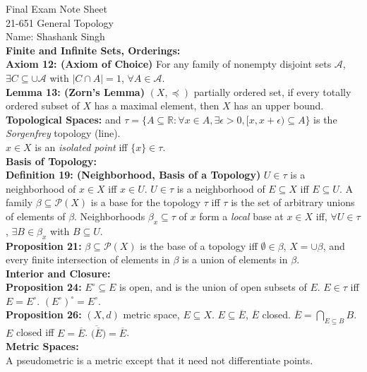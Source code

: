 \documentclass[11pt]{article}
\newcommand{\myname}{Shashank Singh}
\newcommand{\myclass}{21-651 General Topology}
\newcommand{\R}{\mathbb{R}} %
\newcommand{\pow}[1]{\mathcal{P}\left(#1\right)} %
\begin{document}
\thispagestyle{plain}

{\Large Final Exam Note Sheet} \\
\myclass \\
Name: \myname \\
{\bf Finite and Infinite Sets, Orderings:} \\
{\bf Axiom 12: (Axiom of Choice)} For any family of nonempty disjoint sets
$\mathcal{A}$, $\exists C \subseteq \cup \mathcal{A}$ with $|C \cap A| = 1$,
$\forall A \in \mathcal{A}$. \\
{\bf Lemma 13: (Zorn's Lemma)} $(X,\preceq)$ partially ordered set, if every
totally ordered subset of $X$ has a maximal element, then $X$ has an upper
bound. \\
{\bf Topological Spaces:}
and $\tau = \{A \subseteq \R : \forall x \in A, \exists \epsilon > 0,
[x,x + \epsilon) \subseteq A\}$ is the \emph{Sorgenfrey} topology (line). \\
$x \in X$ is an \emph{isolated point} iff $\{x\} \in \tau$. \\
{\bf Basis of Topology:} \\
{\bf Definition 19: (Neighborhood, Basis of a Topology)} $U \in \tau$ is a
neighborhood of $x \in X$ iff $x \in U$. $U \in \tau$ is a neighborhood of
$E \subseteq X$ iff $E \subseteq U$.
A family $\beta \subseteq \pow{X}$ is a
base for the topology $\tau$ iff $\tau$ is the set of arbitrary unions of
elements of $\beta$.
Neighborhoods $\beta_x \subseteq \tau$ of $x$ form a \emph{local} base at
$x \in X$ iff, $\forall U \in \tau$,
$\exists B \in \beta_x$ with $B \subseteq U$. \\
{\bf Proposition 21:} $\beta \subseteq \pow{X}$ is the base of a topology iff
$\emptyset \in \beta$, $X = \cup \beta$, and every finite intersection of
elements in $\beta$ is a union of elements in $\beta$. \\
{\bf Interior and Closure:} \\
{\bf Proposition 24:} $E^\circ \subseteq E$ is open, and is the union of open
subsets of $E$. $E \in \tau$ iff $E = E^\circ$. $(E^\circ)^\circ = E^\circ$.
\\
{\bf Proposition 26:} $(X,d)$ metric space, $E \subseteq X$.
$E \subseteq \overline{E}$, $\overline{E}$ closed. $\overline{E} =
\bigcap_{E \subseteq B} B$. $E$ closed iff $E = \overline{E}$.
$\overline{(\overline{E}}) = \overline{E}$. \\
{\bf Metric Spaces:} \\
A pseudometric is a metric except that it need not differentiate points. \\
\end{document}
